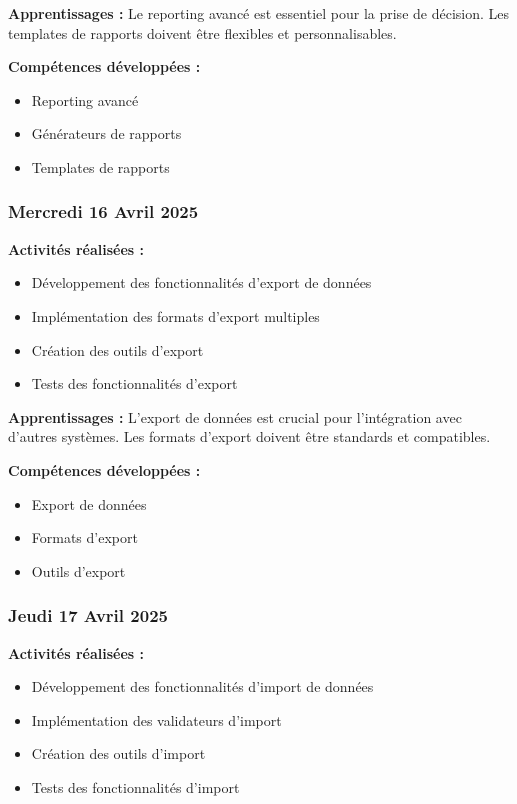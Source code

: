 \documentclass[12pt,a4paper]{article}
\begin{document}
\textbf{Apprentissages :}
Le reporting avancé est essentiel pour la prise de décision. Les templates de rapports doivent être flexibles et personnalisables.

\textbf{Compétences développées :}
\begin{itemize}
    \item Reporting avancé
    \item Générateurs de rapports
    \item Templates de rapports
\end{itemize}

\subsubsection{Mercredi 16 Avril 2025}
\textbf{Activités réalisées :}
\begin{itemize}
    \item Développement des fonctionnalités d'export de données
    \item Implémentation des formats d'export multiples
    \item Création des outils d'export
    \item Tests des fonctionnalités d'export
\end{itemize}

\textbf{Apprentissages :}
L'export de données est crucial pour l'intégration avec d'autres systèmes. Les formats d'export doivent être standards et compatibles.

\textbf{Compétences développées :}
\begin{itemize}
    \item Export de données
    \item Formats d'export
    \item Outils d'export
\end{itemize}

\subsubsection{Jeudi 17 Avril 2025}
\textbf{Activités réalisées :}
\begin{itemize}
    \item Développement des fonctionnalités d'import de données
    \item Implémentation des validateurs d'import
    \item Création des outils d'import
    \item Tests des fonctionnalités d'import
\end{itemize}
\end{document}
